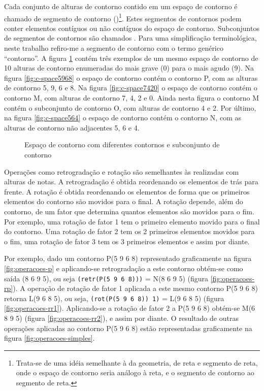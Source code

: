 Cada conjunto de alturas de contorno contido em um espaço de contorno
é chamado de segmento de contorno ()\footnote{Trata-se de uma idéia semelhante à da
  geometria, de reta e segmento de reta, onde o espaço de contorno
  seria análogo à reta, e o segmento de contorno ao segmento de
  reta.}. Estes segmentos de contornos podem conter elementos
contíguos ou não contíguos do espaço de contorno. Subconjuntos de
segmentos de contornos são chamados . Para uma simplificação terminológica, neste trabalho
refiro-me a segmento de contorno com o termo genérico ``contorno''. A
figura \ref{fig:c-space} contém três exemplos de um mesmo espaço de
contorno de 10 alturas de contorno enumeradas do mais grave (0) para o
mais agudo (9). Na figura \ref{fig:c-space5968} o espaço de contorno
contém o contorno P, com as alturas de contorno 5, 9, 6 e 8. Na figura
\ref{fig:c-space7420} o espaço de contorno contém o contorno M, com
alturas de contorno 7, 4, 2 e 0. Ainda nesta figura o contorno M
contém o subconjunto de contorno O, com alturas de contorno 4 e 2. Por
último, na figura \ref{fig:c-space564} o espaço de contorno contém o
contorno N, com as alturas de contorno não adjacentes 5, 6 e 4.

\begin{figure}
  \centering

  \caption{Espaço de contorno com diferentes contornos e subconjunto
    de contorno}
  \label{fig:c-space}
\end{figure}

Operações como retrogradação e rotação são semelhantes às realizadas
com alturas de notas. A retrogradação é obtida reordenando os
elementos de trás para frente. A rotação é obtida reordenando os
elementos de forma que os primeiros elementos do contorno são movidos
para o final. A rotação depende, além do contorno, de um fator que
determina quantos elementos são movidos para o fim. Por exemplo, uma
rotação de fator 1 tem o primeiro elemento movido para o final do
contorno. Uma rotação de fator 2 tem os 2 primeiros elementos movidos
para o fim, uma rotação de fator 3 tem os 3 primeiros elementos e
assim por diante.

Por exemplo, dado um contorno P(5 9 6 8) representado graficamente na
figura \ref{fig:operacoes-p} e aplicando-se retrogradação a este
contorno obtém-se como saída (8 6 9 5), ou seja
\verb!(retr(P(5 9 6 8)))! = N(8 6 9 5) (figura
\ref{fig:operacoes-rp}). A operação de rotação de fator 1 aplicada a
este mesmo contorno P(5 9 6 8) retorna L(9 6 8 5), ou seja,
\verb!(rot(P(5 9 6 8)) 1)! = L(9 6 8 5) (figura
\ref{fig:operacoes-rr1}). Aplicando-se a rotação de fator 2 a P(5 9 6
8) obtém-se M(6 8 9 5) (figura \ref{fig:operacoes-rr2}), e assim por
diante. O resultado de outras operações aplicadas ao contorno P(5 9 6
8) estão representadas graficamente na figura
\ref{fig:operacoes-simples}.

